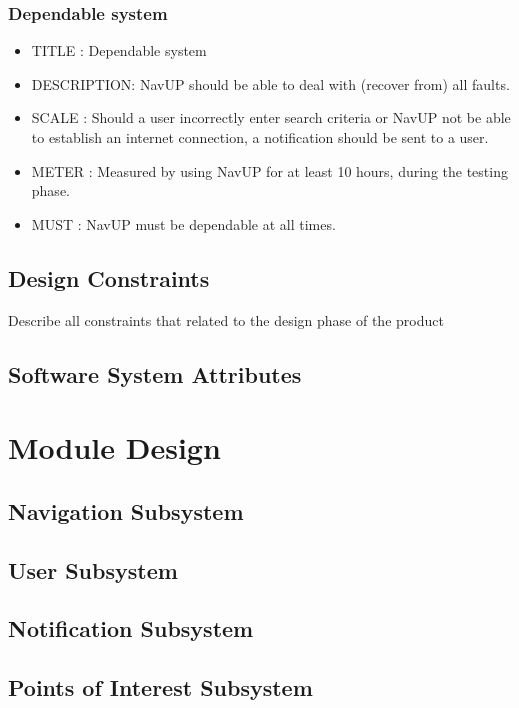 \documentclass{article}
\begin{document}
			\subsubsection{Dependable system}
			\begin{itemize}
		    \item[]TITLE      : Dependable system
		    \item[]DESCRIPTION: NavUP should be able to deal with (recover from) all faults.
		    \item[]SCALE      : Should a user incorrectly enter search criteria or NavUP not be able to establish an internet connection, a notification should be sent to a user.
		    \item[]METER      : Measured by using NavUP for at least 10 hours, during the testing phase.
		    \item[]MUST       : NavUP must be dependable at all times.
		    \end{itemize}	
						
			\subsection{Design Constraints}\label{subsec:design constraints}	
				Describe all constraints that related to the design phase of the product
			\subsection{Software System Attributes}\label{subsec:attributes}

		\newpage

		\section{Module Design}\label{sec:moduels}	
			\subsection{Navigation Subsystem}\label{subsec:navigation}
			\subsection{User Subsystem}\label{subsec:users}
			\subsection{Notification Subsystem}\label{subsec:notification}
			\subsection{Points of Interest Subsystem}\label{subsec:points of interest}
\end{document}
